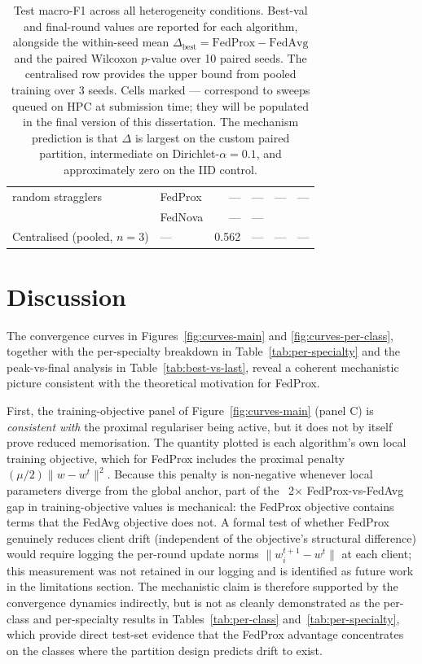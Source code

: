 \documentclass[11pt,a4paper]{article}
\begin{document}
\begin{table}[!htbp]
\begin{tabular}{@{}l l r r r r@{}}
random stragglers          & FedProx & ---   & ---   & ---     & ---    \\
                           & FedNova & ---   & ---   &         &        \\
\midrule
Centralised (pooled, $n = 3$) & ---  & 0.562 & ---   & ---     & ---    \\
\bottomrule
\end{tabular}
\caption{Test macro-F1 across all heterogeneity conditions. Best-val
and final-round values are reported for each algorithm, alongside the
within-seed mean $\Delta_{\text{best}} = \mathrm{FedProx} - \mathrm{FedAvg}$
and the paired Wilcoxon $p$-value over 10 paired seeds. The centralised
row provides the upper bound from pooled training over 3 seeds. Cells
marked --- correspond to sweeps queued on HPC at submission time; they
will be populated in the final version of this dissertation. The
mechanism prediction is that $\Delta$ is largest on the custom paired
partition, intermediate on Dirichlet-$\alpha = 0.1$, and approximately
zero on the IID control.}
\label{tab:summary}
\end{table}

\section{Discussion}

The convergence curves in Figures~\ref{fig:curves-main} and
\ref{fig:curves-per-class}, together with the per-specialty
breakdown in Table~\ref{tab:per-specialty} and the
peak-vs-final analysis in Table~\ref{tab:best-vs-last}, reveal a coherent
mechanistic picture consistent with the theoretical motivation for FedProx.

First, the training-objective panel of Figure~\ref{fig:curves-main}
(panel C) is \emph{consistent with} the proximal regulariser being
active, but it does not by itself prove reduced memorisation. The
quantity plotted is each algorithm's own local training objective,
which for FedProx includes the proximal penalty
$(\mu/2)\lVert w - w^t \rVert^2$. Because this penalty is non-negative
whenever local parameters diverge from the global anchor, part of the
~2$\times$ FedProx-vs-FedAvg gap in training-objective values is
mechanical: the FedProx objective contains terms that the FedAvg
objective does not. A formal test of whether FedProx genuinely reduces
client drift (independent of the objective's structural difference)
would require logging the per-round update norms
$\lVert w_i^{t+1} - w^t \rVert$ at each client; this measurement was
not retained in our logging and is identified as future work in the
limitations section. The mechanistic claim is therefore supported by
the convergence dynamics indirectly, but is not as cleanly demonstrated
as the per-class and per-specialty results in
Tables~\ref{tab:per-class} and~\ref{tab:per-specialty}, which provide
direct test-set evidence that the FedProx advantage concentrates on
the classes where the partition design predicts drift to exist.
\end{document}
